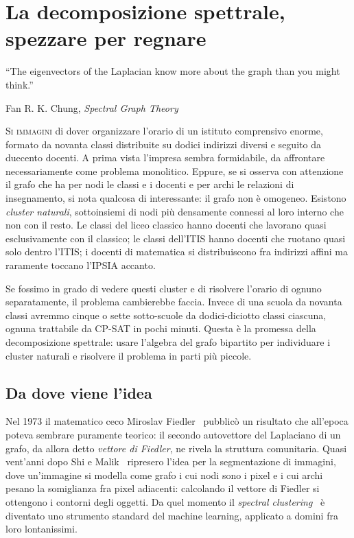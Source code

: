\chapter{La decomposizione spettrale, spezzare per regnare}
\label{ch:metodo_spettrale}


\epigraph{``The eigenvectors of the Laplacian know more about
the graph than you might think.''}{Fan R. K. Chung,
\emph{Spectral Graph Theory}~\parencite{chung1997}}

\lettrine[lines=3]{S}{i immagini} di dover organizzare l'orario
di un istituto comprensivo enorme, formato da novanta
classi distribuite su dodici indirizzi diversi e seguito da
duecento docenti. A prima vista l'impresa sembra
formidabile, da affrontare necessariamente come problema
monolitico. Eppure, se si osserva con attenzione il grafo
che ha per nodi le classi e i docenti e per archi le
relazioni di insegnamento, si nota qualcosa di interessante:
il grafo non \`e omogeneo. Esistono \emph{cluster naturali},
sottoinsiemi di nodi pi\`u densamente connessi al loro
interno che non con il resto. Le classi del liceo classico
hanno docenti che lavorano quasi esclusivamente con il
classico; le classi dell'ITIS hanno docenti che ruotano
quasi solo dentro l'ITIS; i docenti di matematica si
distribuiscono fra indirizzi affini ma raramente toccano
l'IPSIA accanto.

Se fossimo in grado di vedere questi cluster e di risolvere
l'orario di ognuno separatamente, il problema cambierebbe
faccia. Invece di una scuola da novanta classi avremmo
cinque o sette sotto-scuole da dodici-diciotto classi
ciascuna, ognuna trattabile da CP-SAT in pochi minuti.
Questa \`e la promessa della decomposizione spettrale: usare
l'algebra del grafo bipartito per individuare i cluster
naturali e risolvere il problema in parti pi\`u piccole.

\section{Da dove viene l'idea}

\begin{storiabox}
Nel 1973 il matematico ceco Miroslav
Fiedler~\parencite{fiedler1973} pubblic\`o un risultato che
all'epoca poteva sembrare puramente teorico: il secondo
autovettore del Laplaciano di un grafo, da allora detto
\emph{vettore di Fiedler}, ne rivela la struttura
comunitaria. Quasi vent'anni dopo Shi e
Malik~\parencite{shi2000} ripresero l'idea per la
segmentazione di immagini, dove un'immagine si modella come
grafo i cui nodi sono i pixel e i cui archi pesano la
somiglianza fra pixel adiacenti: calcolando il vettore di
Fiedler si ottengono i contorni degli oggetti. Da quel
momento il \emph{spectral
clustering}~\parencite{vonluxburg2007} \`e diventato uno
strumento standard del machine learning, applicato a domini
fra loro lontanissimi.
\end{storiabox}

